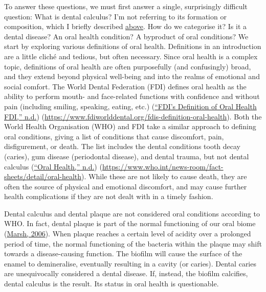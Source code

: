 \documentclass[
  b5paper,
]{book}
\begin{document}
To answer these questions, we must first answer a single, surprisingly
difficult question: What is dental calculus? I'm not referring to its
formation or composition, which I briefly described
\protect\hyperlink{chap-intro}{above}. How do we categorise it? Is it a
dental disease? An oral health condition? A byproduct of oral
conditions? We start by exploring various definitions of oral health.
Definitions in an introduction are a little cliché and tedious, but
often necessary. Since oral health is a complex topic, definitions of
oral health are often purposefully (and confusingly) broad, and they
extend beyond physical well-being and into the realms of emotional and
social comfort. The World Dental Federation (FDI) defines oral health as
the ability to perform mouth- and face-related functions with confidence
and without pain (including smiling, speaking, eating, etc.)
(\protect\hyperlink{ref-fdiOralHealth}{{``{FDI}'s Definition of Oral
Health \textbar{} {FDI},''} n.d.})
(\url{https://www.fdiworlddental.org/fdis-definition-oral-health}). Both
the World Health Organisation (WHO) and FDI take a similar approach to
defining oral conditions, giving a list of conditions that cause
discomfort, pain, disfigurement, or death. The list includes the dental
conditions tooth decay (caries), gum disease (periodontal disease), and
dental trauma, but not dental calculus
(\protect\hyperlink{ref-whoOralHealth}{{``Oral Health,''} n.d.})
(\url{https://www.who.int/news-room/fact-sheets/detail/oral-health}).
While these are not likely to cause death, they are often the source of
physical and emotional discomfort, and may cause further health
complications if they are not dealt with in a timely fashion.

Dental calculus and dental plaque are not considered oral conditions
according to WHO. In fact, dental plaque is part of the normal
functioning of our oral biome
(\protect\hyperlink{ref-marshDentalPlaque2006}{Marsh, 2006}). When
plaque reaches a certain level of acidity over a prolonged period of
time, the normal functioning of the bacteria within the plaque may shift
towards a disease-causing function. The biofilm will cause the surface
of the enamel to demineralise, eventually resulting in a cavity (or
caries). Dental caries are unequivocally considered a dental disease.
If, instead, the biofilm calcifies, dental calculus is the result. Its
status in oral health is questionable.
\end{document}
